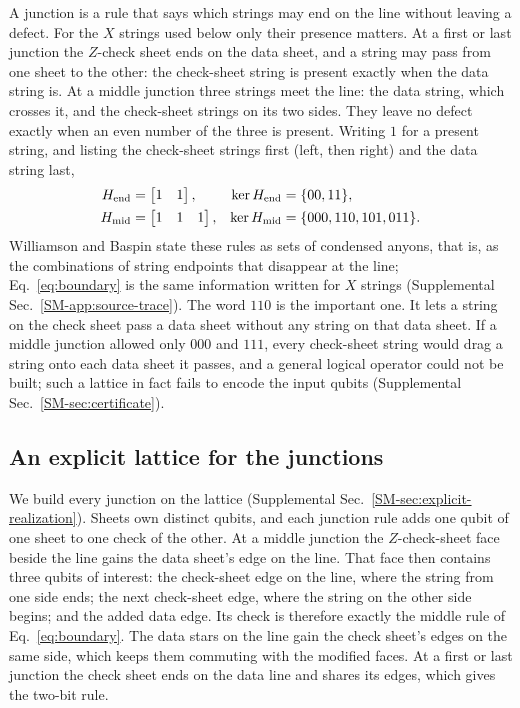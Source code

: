 A junction is a rule that says which strings may end on the line without
leaving a defect.  For the $X$ strings used below only their presence
matters.  At a first or last junction the $Z$-check sheet ends on the data
sheet, and a string may pass from one sheet to the other: the check-sheet
string is present exactly when the data string is.  At a middle junction
three strings meet the line: the data string, which crosses it, and the
check-sheet strings on its two sides.  They leave no defect exactly when an
even number of the three is present.  Writing $1$ for a present string, and
listing the check-sheet strings first (left, then right) and the data string
last,
\begin{align}
 H_{\rm end}&=\begin{bmatrix}1&1\end{bmatrix}, &
 \ker H_{\rm end}&=\{00,11\},\nonumber\\
 H_{\rm mid}&=\begin{bmatrix}1&1&1\end{bmatrix}, &
 \ker H_{\rm mid}&=\{000,110,101,011\}.
 \label{eq:boundary}
\end{align}
Williamson and Baspin state these rules as sets of condensed anyons, that is,
as the combinations of string endpoints that disappear at the line;
Eq.~\eqref{eq:boundary} is the same information written for $X$ strings
(Supplemental Sec.~\ref{SM-app:source-trace}).  The word $110$ is the
important one.  It lets a string on the check sheet pass a data sheet without
any string on that data sheet.  If a middle junction allowed only $000$ and
$111$, every check-sheet string would drag a string onto each data sheet it
passes, and a general logical operator could not be built; such a lattice in
fact fails to encode the input qubits (Supplemental
Sec.~\ref{SM-sec:certificate}).

\subsection{An explicit lattice for the junctions}
We build every junction on the lattice (Supplemental
Sec.~\ref{SM-sec:explicit-realization}).  Sheets own distinct qubits, and
each junction rule adds one qubit of one sheet to one check of the other.  At
a middle junction the $Z$-check-sheet face beside the line gains the data
sheet's edge on the line.  That face then contains three qubits of interest:
the check-sheet edge on the line, where the string from one side ends; the
next check-sheet edge, where the string on the other side begins; and the
added data edge.  Its check is therefore exactly the middle rule of
Eq.~\eqref{eq:boundary}.  The data stars on the line gain the check sheet's
edges on the same side, which keeps them commuting with the modified faces.
At a first or last junction the check sheet ends on the data line and shares
its edges, which gives the two-bit rule.

